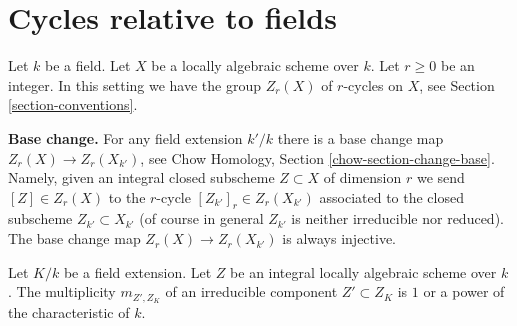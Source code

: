 \section{Cycles relative to fields}
\label{section-relative-fields}

\noindent
Let $k$ be a field. Let $X$ be a locally algebraic scheme over $k$.
Let $r \geq 0$ be an integer. In this setting we have the group
$Z_r(X)$ of $r$-cycles on $X$, see Section \ref{section-conventions}.

\medskip\noindent
{\bf Base change.} For any field extension $k'/k$ there is a base change
map $Z_r(X) \to Z_r(X_{k'})$, see
Chow Homology, Section \ref{chow-section-change-base}.
Namely, given an integral closed subscheme $Z \subset X$
of dimension $r$ we send $[Z] \in Z_r(X)$ to the $r$-cycle
$[Z_{k'}]_r \in Z_r(X_{k'})$ associated to the closed subscheme
$Z_{k'} \subset X_{k'}$ (of course in general $Z_{k'}$
is neither irreducible nor reduced). The base change map
$Z_r(X) \to Z_r(X_{k'})$ is always injective.

\begin{lemma}
\label{lemma-multiplicities-field-extension}
Let $K/k$ be a field extension. Let $Z$ be an integral locally algebraic
scheme over $k$. The multiplicity $m_{Z', Z_K}$ of an irreducible
component $Z' \subset Z_K$ is $1$ or a power of the characteristic of $k$.
\end{lemma}

